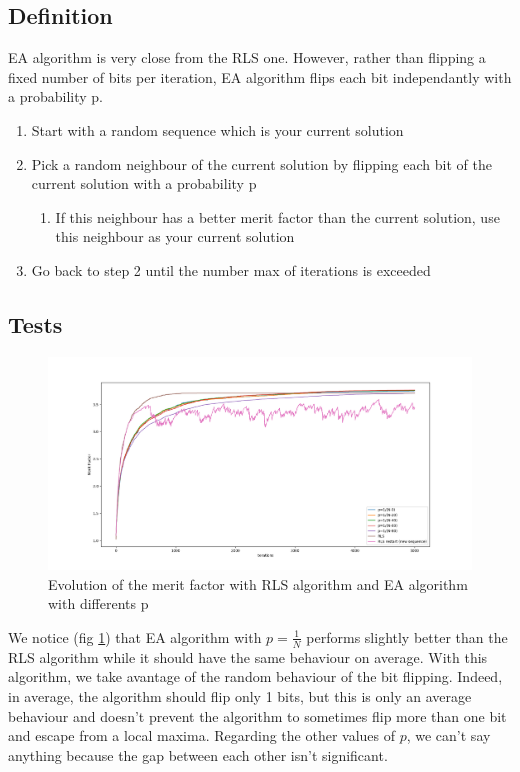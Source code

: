 \documentclass[a4paper,11pt,openany]{article}
\begin{document}
\subsection{Definition}
\noindent
EA algorithm \cite{ea} is very close from the RLS one. However, rather than flipping a fixed number of bits per iteration, EA algorithm flips each bit independantly with a probability p.
\begin{enumerate}
\item Start with a random sequence which is your current solution
\item Pick a random neighbour of the current solution by flipping each bit of the current solution with a probability p
\begin{enumerate}
\item If this neighbour has a better merit factor than the current solution, use this neighbour as your current solution
\end{enumerate}
\item Go back to step 2 until the number max of iterations is exceeded
\end{enumerate}
\subsection{Tests}
\begin{figure}[H]
\begin{center}
\includegraphics[scale=0.28]{Images/ea_different_p}
\caption{Evolution of the merit factor with RLS algorithm and EA algorithm with differents p}
\label{fig:ea_different_p}
\end{center}
\end{figure}
\noindent
We notice (fig \ref{fig:ea_different_p})  that EA algorithm with $p=\frac{1}{N}$ performs slightly better than the RLS algorithm while it should have the same behaviour on average. With this algorithm, we take avantage of the random behaviour of the bit flipping. Indeed, in average, the algorithm should flip only 1 bits, but this is only an average behaviour and doesn't prevent the algorithm to sometimes flip more than one bit and escape from a local maxima. Regarding the other values of $p$, we can't say anything because the gap between each other isn't significant.
\end{document}
